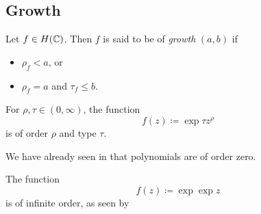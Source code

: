 \subsection{Growth}

\begin{definition}
    Let $f \in H(\mathbb{C})$. Then $f$ is said to be of \emph{growth} $(a, b)$ if
    \begin{itemize}
        \item $\rho_f < a$, or
        \item $\rho_f = a$ and $\tau_f \leq b$.
    \end{itemize}
\end{definition}

\begin{example} \label{exm:order-and-type}
    For $\rho, \tau \in (0, \infty)$, the function
    $$ f(z) \coloneqq \exp {\tau z^\rho} $$
    is of order $\rho$ and type $\tau$.

    We have already seen in  that polynomials are of order zero.

    The function
    $$ f(z) \coloneqq \exp \exp z $$
    is of infinite order, as seen by 
\end{example}